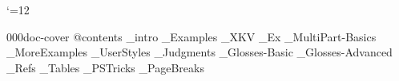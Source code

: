 


 \catcode`\@=12










\get 000doc-cover
\get @contents
_intro
_Examples
_XKV
_Ex
_MultiPart-Basics
_MoreExamples
_UserStyles
_Judgments
_Glosses-Basic
_Glosses-Advanced
_Refs
_Tables
_PSTricks
_PageBreaks
 \bye

\bye

